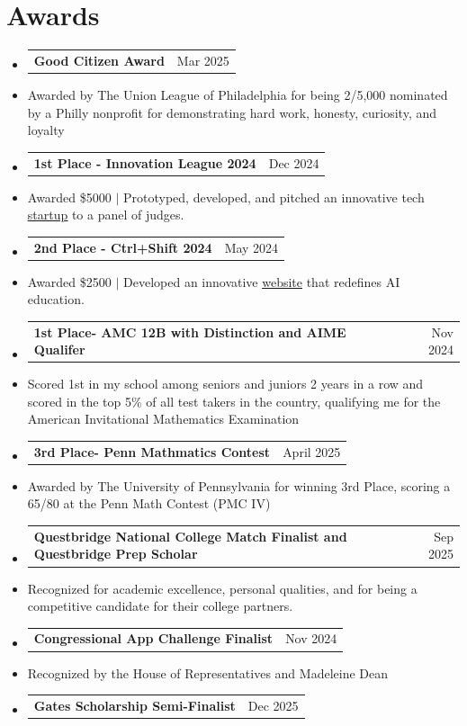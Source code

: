 \documentclass[letterpaper,11pt]{article}
\makeatletter
\newcommand{\resumeItem}[1]{
  \item\small{
    {#1 \vspace{-2pt}}
  }
}
\newcommand{\resumeProjectHeading}[2]{
    \item
    \begin{tabular*}{0.97\textwidth}{l@{\extracolsep{\fill}}r}
      \normalsize#1 & #2 \\
    \end{tabular*}\vspace{-7pt}
}
\newcommand{\resumeSubHeadingListStart}{\begin{itemize}[leftmargin=0.15in, label={}]}
\newcommand{\resumeSubHeadingListEnd}{\end{itemize}}
\makeatother
\begin{document}
\section{Awards}
    \resumeSubHeadingListStart
      \resumeProjectHeading
          {\textbf{Good Citizen Award}}{Mar 2025}
          \resumeItem{Awarded by The Union League of Philadelphia for being 2/5,000 nominated by a Philly nonprofit for demonstrating hard work, honesty, curiosity, and loyalty}
      \resumeProjectHeading
          {\textbf{1st Place - Innovation League 2024}}{Dec 2024}
            \resumeItem{Awarded \$5000 $|$ Prototyped, developed, and pitched an innovative tech \href{micropantry.org}{\underline{startup}} to a panel of judges.}
      \resumeProjectHeading
          {\textbf{2nd Place - Ctrl+Shift 2024}}{May 2024}
            \resumeItem{Awarded \$2500 $|$ Developed an innovative \href{https://li-valen.github.io/LearnAI/}{\underline{website}} that redefines AI education.} 
      \resumeProjectHeading
          {\textbf{1st Place- AMC 12B with Distinction and AIME Qualifer}}{Nov 2024}
            \resumeItem{Scored 1st in my school among seniors and juniors 2 years in a row and scored in the top 5\% of all test takers in the country, qualifying me for the American Invitational Mathematics Examination}
      \resumeProjectHeading
          {\textbf{3rd Place- Penn Mathmatics Contest}}{April 2025}
          \resumeItem{Awarded by The University of Pennsylvania for winning 3rd Place, scoring a 65/80 at the Penn Math Contest (PMC IV)}
      \resumeProjectHeading
          {\textbf{Questbridge National College Match Finalist and Questbridge Prep Scholar}}{Sep 2025}
          \resumeItem{Recognized for academic excellence, personal qualities, and for being a competitive candidate for their college partners.}\
      \resumeProjectHeading
          {\textbf{Congressional App Challenge Finalist}}{Nov 2024}
          \resumeItem{Recognized by the House of Representatives and Madeleine Dean}
    \resumeProjectHeading
        {\textbf{Gates Scholarship Semi-Finalist}}
        {Dec 2025}
    \resumeSubHeadingListEnd
\end{document}

